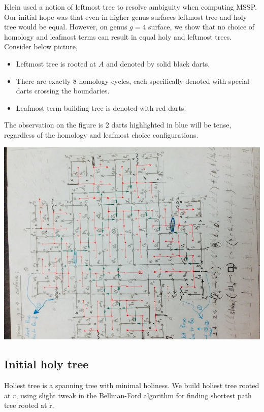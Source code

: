 \documentclass{article}
\begin{document}
Klein \cite{klein2005multiple} used a notion of leftmost tree to resolve ambiguity when 
computing MSSP.
Our initial hope was that even in higher genus surfaces leftmost tree and holy
tree would be equal. However, on genus $g = 4$ surface, we show that no
choice of homology and leafmost terms can result in equal holy and
leftmost trees. Consider below picture, \\
\begin{itemize}
\item Leftmost tree is rooted at $A$ and denoted by solid black darts.
\item There are exactly 8 homology cycles, each specifically denoted with
special darts crossing the boundaries.
\item Leafmost term building tree is denoted with red darts.
\end{itemize}
The observation on the figure is 2 darts highlighted in blue will be tense, 
regardless of the homology and leafmost choice configurations.
\begin{center}
\includegraphics[angle = -90, scale = 0.7]{figures/Genus4_InitialHolyTree.jpg}
\end{center}

\subsection{Initial holy tree}
Holiest tree is a spanning tree with minimal holiness. We build holiest tree 
rooted at $r$, using slight tweak in the Bellman-Ford algorithm for finding 
shortest path tree rooted at r. \\
\end{document}
